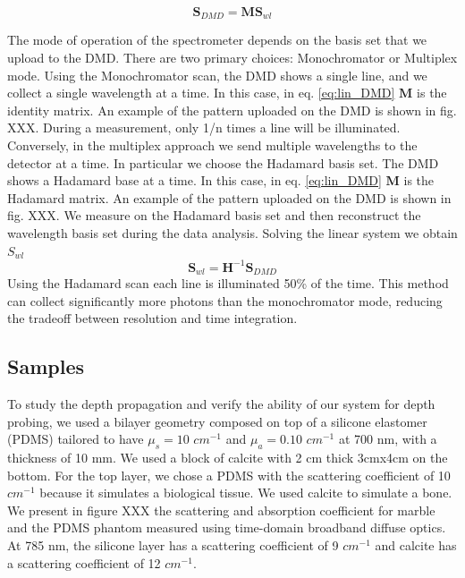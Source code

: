 \documentclass{osa-article}
\begin{document}
\begin{equation}
    \textbf{S}_{DMD} = \textbf{M} \textbf{S}_{wl}
    \label{eq:lin_DMD}
\end{equation}

The mode of operation of the spectrometer depends on the basis set that we upload to the DMD. There are two primary choices: Monochromator or Multiplex mode.
Using the Monochromator scan, the DMD shows a single line, and we collect a single wavelength at a time. In this case, in eq. \ref{eq:lin_DMD} $\textbf{M}$ is the identity matrix. An example of the pattern uploaded on the DMD is shown in fig. XXX. During a measurement, only 1/n times a line will be illuminated. Conversely, in the multiplex approach we send multiple wavelengths to the detector at a time. In particular we choose the Hadamard basis set. The DMD shows a Hadamard base at a time. In this case, in eq. \ref{eq:lin_DMD} $\textbf{M}$ is the Hadamard matrix. An example of the pattern uploaded on the DMD is shown in fig. XXX. We measure on the Hadamard basis set and then reconstruct the wavelength basis set during the data analysis. 
Solving the linear system we obtain $S_{wl}$
\begin{equation}
    \textbf{S}_{wl} = \textbf{H}^{-1} \textbf{S}_{DMD}
\end{equation}
Using the Hadamard scan each line is illuminated 50\% of the time.
This method can collect significantly more photons than the monochromator mode, reducing the tradeoff between resolution and time integration.

\subsection{Samples}
To study the depth propagation and verify the ability of our system for depth probing, we used a bilayer geometry composed on top of a silicone elastomer (PDMS) tailored to have $\mu_s = 10$ $cm^{-1}$ and $\mu_a = 0.10$ $cm^{-1}$  at 700 nm, with a thickness of 10 mm. We used a block of calcite with 2 cm thick 3cmx4cm on the bottom.
For the top layer, we chose a PDMS with the scattering coefficient of 10 $cm^{-1}$ because it simulates a biological tissue. We used calcite to simulate a bone.
We present in figure XXX the scattering and absorption coefficient for marble and the PDMS phantom measured using time-domain broadband diffuse optics. At 785 nm, the silicone layer has a scattering coefficient of 9 $cm^{-1}$ and calcite has a scattering coefficient of 12 $cm^{-1}$.
\end{document}
